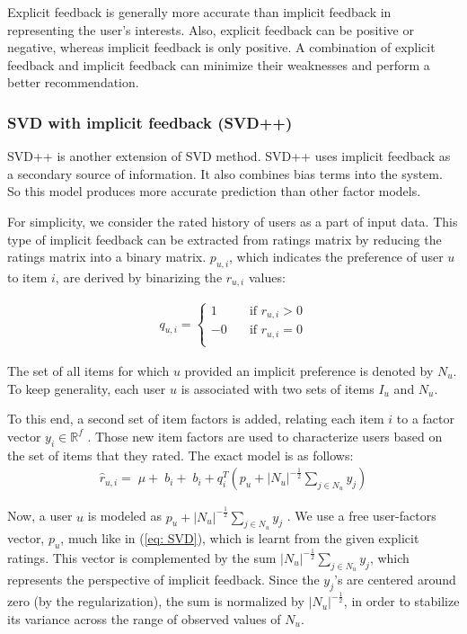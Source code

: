 \documentclass[oneside,13pt]{extreport}
\begin{document}
Explicit feedback is generally more accurate than implicit feedback in representing the user’s interests. Also, explicit feedback can be positive or negative, whereas implicit feedback is only positive. A combination of explicit feedback and implicit feedback can minimize their weaknesses and perform a better recommendation.

\subsubsection{SVD with implicit feedback (SVD++)}
SVD++ is another extension of SVD method. SVD++ uses implicit feedback as a secondary source of information. It also combines bias terms into the system. So this model produces more accurate prediction than other factor models. 

For simplicity, we consider the rated history of users as a part of input data. This type of implicit feedback can be extracted from ratings matrix by reducing the ratings matrix into a binary matrix. $p_{u,i}$, which indicates the preference of user $u$ to item $i$, are derived by binarizing the $r_{u,i}$ values:

\begin{eqnarray}
\label{eq:implicit_binary}
q_{u,i} = \begin{cases} 1 & \quad \text{if } r_{u,i} > 0\\ -0 & \quad \text{if } r_{u,i} = 0\\ \end{cases}
\end{eqnarray}

The set of all items for which $u$ provided an implicit preference is denoted by $N_u$. To keep generality, each user $u$ is associated with two sets of items $I_u$ and $N_u$.

To this end, a second set of item factors is added, relating each item $i$ to a factor
vector ${y_i} \in {\mathbb{R}^f}$ . Those new item factors are used to characterize users based on the
set of items that they rated. The exact model is as follows:
\begin{eqnarray}
\label{eq:svd++_pre}
{\hat r_{u,i}} = \;\mu  + \;{b_i} + \;{b_i} + q_i^T\left( {{p_u} + {{\left| {{N_u}} \right|}^{ - \frac{1}{2}}}\sum\limits_{j \in  {N_u}} {{y_j}} } \right)
\end{eqnarray}

Now, a user $u$ is modeled as $p_u + {{\left| {{N_u}} \right|}^{ - \frac{1}{2}}}\sum\limits_{j \in  {N_u}} {{y_j}}$ . We use a free user-factors
vector, $p_u$, much like in (\ref{eq: SVD}), which is learnt from the given explicit ratings. This
vector is complemented by the sum ${{\left| {{N_u}} \right|}^{ - \frac{1}{2}}}\sum\limits_{j \in {N_u}} {{y_j}}$, which represents the perspective
of implicit feedback. Since the $y_j$’s are centered around zero (by the regularization),
the sum is normalized by ${{\left| {{N_u}} \right|}^{ - \frac{1}{2}}}$, in order to stabilize its variance
across the range of observed values of $N_u$.
\end{document}
